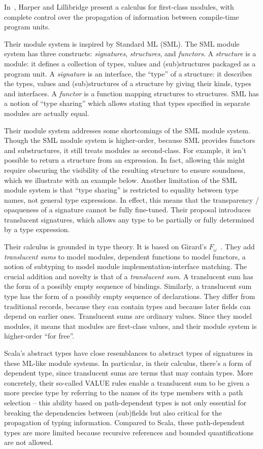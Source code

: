 \documentclass[10pt,journal,a4paper]{IEEEtran}
\begin{document}
In~\cite{homl}, Harper and Lillibridge present a calculus for
first-class modules, with complete control over the propagation of
information between compile-time program units.

Their module system is inspired by Standard ML (SML). The SML module
system has three constructs: {\it signatures}, {\it structures}, and
{\it functors}. A {\it structure} is a module: it defines a collection
of types, values and (sub)structures packaged as a program unit. A
{\it signature} is an interface, the ``type'' of a structure: it
describes the types, values and (sub)structures of a structure by
giving their kinds, types and interfaces. A {\it functor} is a
function mapping structures to structures. SML has a notion of ``type
sharing'' which allows stating that types specified in separate
modules are actually equal.

Their module system addresses some shortcomings of the SML module
system. Though the SML module system is higher-order, because SML
provides functors and substructures, it still treats modules as
second-class. For example, it isn't possible to return a structure
from an  expression. In fact, allowing this might require obscuring
the visibility of the resulting structure to ensure soundness, which
we illustrate with an example below. Another limitation of the SML
module system is that ``type sharing'' is restricted to equality between
type names, not general type expressions. In effect, this means that
the transparency / opaqueness of a signature cannot be fully
fine-tuned. Their proposal introduces translucent signatures, which
allows any type to be partially or fully determined by a type
expression.

Their calculus is grounded in type theory. It is based on Girard's
$F_\omega$~\cite{tapl}. They add {\it translucent sums} to model
modules, dependent functions to model functors, a notion of subtyping
to model module implementation-interface matching. The crucial
addition and novelty is that of a {\it translucent sum}. A translucent
sum has the form of a possibly empty sequence of bindings. Similarly,
a translucent sum type has the form of a possibly empty sequence of
declarations. They differ from traditional records, because they can
contain types and because later fields can depend on earlier
ones. Translucent sums are ordinary values. Since they model modules,
it means that modules are first-class values, and their module system
is higher-order ``for free''.

Scala's abstract types have close resemblances to abstract types of
signatures in these ML-like module systems. In particular, in their
calculus, there's a form of dependent type, since translucent sums are
terms that may contain types. More concretely, their so-called VALUE
rules enable a translucent sum to be given a more precise type by
referring to the names of its type members with a path selection --
this ability based on path-dependent types is not only essential for
breaking the dependencies between (sub)fields but also critical for
the propagation of typing information. Compared to Scala, these
path-dependent types are more limited because recursive references and
bounded quantifications are not allowed.
\end{document}
